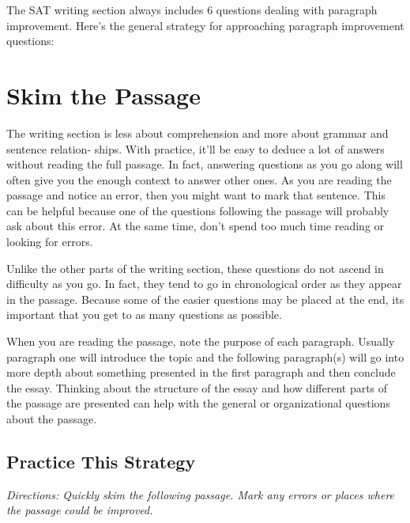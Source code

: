 The SAT writing section always includes 6 questions dealing with paragraph improvement. Here's the general strategy for approaching paragraph improvement questions:

\section{Skim the Passage}
The writing section is less about comprehension and more about grammar and sentence relation-
ships. With practice, it'll be easy to deduce a lot of answers without reading the full passage. In
fact, answering questions as you go along will often give you the enough context to answer other
ones. As you are reading the passage and notice an error, then you might want to mark that sentence. This can be helpful because one of the questions following the passage will probably ask about this error. At the same time, don't spend too much time reading or looking for errors.

\bigskip
Unlike the other parts of the writing section, these questions do not ascend in difficulty as you go. In fact, they tend to go in chronological order as they appear in the passage. Because some of the easier questions may be placed at the end, its important that you get to as many questions as possible.

When you are reading the passage, note the purpose of each paragraph. Usually paragraph one will introduce the topic and the following paragraph(s) will go into more depth about something presented in the first paragraph and then conclude the essay. Thinking about the structure of the essay and how different parts of the passage are presented can help with the general or organizational questions about the passage.

\subsection{Practice This Strategy}
\textit{Directions: Quickly skim the following passage. Mark any errors or places where the passage could be improved.}


